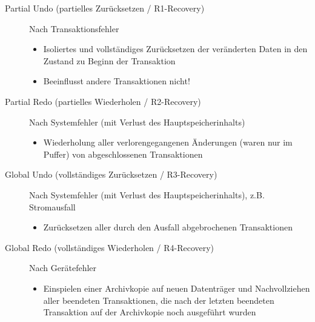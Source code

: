 \documentclass{lehramt-informatik-haupt}
\begin{document}
\begin{description}

%

\item[Partial Undo (partielles Zurücksetzen / R1-Recovery)]

Nach Transaktionsfehler

\begin{itemize}
\item Isoliertes und vollständiges Zurücksetzen der veränderten Daten in
den Zustand zu Beginn der Transaktion

\item Beeinflusst andere Transaktionen nicht!
\end{itemize}

%

\item[Partial Redo (partielles Wiederholen / R2-Recovery)]

Nach Systemfehler (mit Verlust des Hauptspeicherinhalts)

\begin{itemize}
\item Wiederholung aller verlorengegangenen Änderungen (waren nur im
Puffer) von abgeschlossenen Transaktionen
\end{itemize}

%

\item[Global Undo (vollständiges Zurücksetzen / R3-Recovery)]

Nach Systemfehler (mit Verlust des Hauptspeicherinhalts), z.B.
Stromausfall

\begin{itemize}
\item Zurücksetzen aller durch den Ausfall abgebrochenen Transaktionen
\end{itemize}

%

\item[Global Redo (vollständiges Wiederholen / R4-Recovery)]

Nach Gerätefehler

\begin{itemize}
\item Einspielen einer Archivkopie auf neuen Datenträger und
Nachvollziehen aller beendeten Transaktionen, die nach der letzten
beendeten Transaktion auf der Archivkopie noch ausgeführt wurden
\end{itemize}

\end{description}
\end{document}
